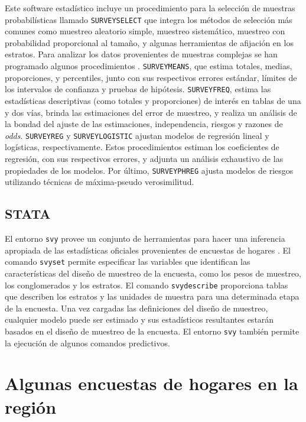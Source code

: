 Este software estadístico incluye un procedimiento para la selección de muestras probabilísticas llamado \texttt{SURVEYSELECT} que integra los métodos de selección más comunes como muestreo aleatorio simple, muestreo sistemático, muestreo con probabilidad proporcional al tamaño, y algunas herramientas de afijación en los estratos. Para analizar los datos provenientes de muestras complejas se han programado algunos procedimientos \citep{SAS_2017}. \texttt{SURVEYMEANS}, que estima totales, medias, proporciones, y percentiles, junto con sus respectivos errores estándar, límites de los intervalos de confianza y pruebas de hipótesis. \texttt{SURVEYFREQ}, estima las estadísticas descriptivas (como totales y proporciones) de interés en tablas de una y dos vías, brinda las estimaciones del error de muestreo, y realiza un análisis de la bondad del ajuste de las estimaciones, independencia, riesgos y razones de \emph{odds}. \texttt{SURVEYREG} y \texttt{SURVEYLOGISTIC} ajustan modelos de regresión lineal y logísticas, respectivamente. Estos procedimientos estiman los coeficientes de regresión, con sus respectivos errores, y adjunta un análisis exhaustivo de las propiedades de los modelos. Por último, \texttt{SURVEYPHREG} ajusta modelos de riesgos utilizando técnicas de máxima-pseudo verosimilitud.

\hypertarget{stata}{%
\subsection*{STATA}\label{stata}}


El entorno \texttt{svy} provee un conjunto de herramientas para hacer una inferencia apropiada de las estadísticas oficiales provenientes de encuestas de hogares \citep{STATA_2017}. El comando \texttt{svyset} permite especificar las variables que identifican las características del diseño de muestreo de la encuesta, como los pesos de muestreo, los conglomerados y los estratos. El comando \texttt{svydescribe} proporciona tablas que describen los estratos y las unidades de muestra para una determinada etapa de la encuesta. Una vez cargadas las definiciones del diseño de muestreo, cualquier modelo puede ser estimado y sus estadísticos resultantes estarán basados en el diseño de muestreo de la encuesta. El entorno \texttt{svy} también permite la ejecución de algunos comandos predictivos.

\hypertarget{algunas-encuestas-de-hogares-en-la-region}{%
\section*{Algunas encuestas de hogares en la región}\label{algunas-encuestas-de-hogares-en-la-region}}


